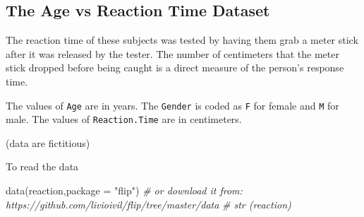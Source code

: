 \documentclass[
]{article}
\newenvironment{Shaded}{\begin{snugshade}}{\end{snugshade}}
\newcommand{\AttributeTok}[1]{\textcolor[rgb]{0.77,0.63,0.00}{#1}}
\newcommand{\CommentTok}[1]{\textcolor[rgb]{0.56,0.35,0.01}{\textit{#1}}}
\newcommand{\DecValTok}[1]{\textcolor[rgb]{0.00,0.00,0.81}{#1}}
\newcommand{\FloatTok}[1]{\textcolor[rgb]{0.00,0.00,0.81}{#1}}
\newcommand{\FunctionTok}[1]{\textcolor[rgb]{0.00,0.00,0.00}{#1}}
\newcommand{\NormalTok}[1]{#1}
\newcommand{\OtherTok}[1]{\textcolor[rgb]{0.56,0.35,0.01}{#1}}
\newcommand{\SpecialCharTok}[1]{\textcolor[rgb]{0.00,0.00,0.00}{#1}}
\newcommand{\StringTok}[1]{\textcolor[rgb]{0.31,0.60,0.02}{#1}}
\begin{document}
\begin{Shaded}
\end{Shaded}

\hypertarget{the-age-vs-reaction-time-dataset}{%
\subsection{The Age vs Reaction Time
Dataset}\label{the-age-vs-reaction-time-dataset}}

The reaction time of these subjects was tested by having them grab a
meter stick after it was released by the tester. The number of
centimeters that the meter stick dropped before being caught is a direct
measure of the person's response time.

The values of \texttt{Age} are in years. The \texttt{Gender} is coded as
\texttt{F} for female and \texttt{M} for male. The values of
\texttt{Reaction.Time} are in centimeters.

(data are fictitious)

To read the data

\begin{Shaded}
\begin{Highlighting}[]
\FunctionTok{data}\NormalTok{(reaction,}\AttributeTok{package =} \StringTok{"flip"}\NormalTok{)}
\CommentTok{\# or download it from: https://github.com/livioivil/flip/tree/master/data}
\CommentTok{\# str (reaction)}
\end{Highlighting}
\end{Shaded}
\end{document}
